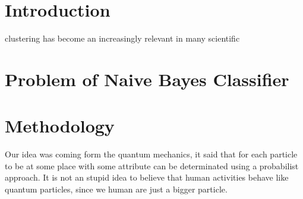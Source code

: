 \documentclass[a4paper, conference]{IEEEtran}
\begin{document}
\maketitle
\pagestyle{empty}
\thispagestyle{empty}
\IEEEpeerreviewmaketitle









%
\IEEEpeerreviewmaketitle





\section{Introduction}
{} clustering has become an increasingly relevant in many scientific 
\section{Problem of Naive Bayes Classifier}
\section{Methodology}
Our idea was coming form the quantum mechanics, it said that for each particle to be at some place with some attribute can be determinated using a probabilist approach. It is not an stupid idea to believe that human activities behave like quantum particles, since we human are just a bigger particle.
\end{document}
